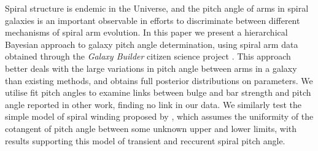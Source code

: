 Spiral structure is endemic in the Universe, and the pitch angle of arms in spiral galaxies is an important observable in efforts to discriminate between different mechanisms of spiral arm evolution. In this paper we present a hierarchical Bayesian approach to galaxy pitch angle determination, using spiral arm data obtained through the \textit{Galaxy Builder} citizen science project \citep{2020arXiv200610450L}. This approach better deals with the large variations in pitch angle between arms in a galaxy than existing methods, and obtains full posterior distributions on parameters. We utilise fit pitch angles to examine links between bulge and bar strength and pitch angle reported in other work, finding no link in our data. We similarly test the simple model of spiral winding proposed by \citet{2019arXiv190910291P}, which assumes the uniformity of the cotangent of pitch angle between some unknown upper and lower limits, with results supporting this model of transient and reccurent spiral pitch angle.
